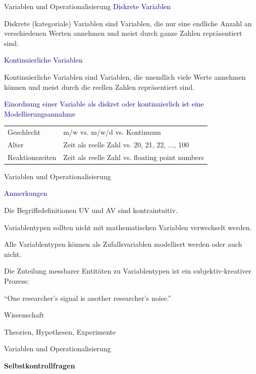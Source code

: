 \documentclass[
  8pt,
  ignorenonframetext,
]{beamer}
\begin{document}
\begin{frame}{Variablen und Operationalisierung}
\protect\hypertarget{variablen-und-operationalisierung-2}{}
\textcolor{darkblue}{Diskrete Variablen}

Diskrete (kategoriale) Variablen sind Variablen, die nur eine endliche
Anzahl an verschiedenen Werten annehmen und meist durch ganze Zahlen
repräsentiert sind. \vspace{4mm}

\textcolor{darkblue}{Kontinuierliche Variablen}

Kontinuierliche Variablen sind Variablen, die unendlich viele Werte
annehmen können und meist durch die reellen Zahlen repräsentiert sind.
\vspace{4mm}

\textcolor{darkblue}{Einordnung einer Variable als diskret oder kontinuierlich ist eine Modellierungsannahme}

\center
\begin{tabular}{ll}
Geschlecht        & m/w vs. m/w/d vs. Kontinuum                        \\
Alter             & Zeit als reelle Zahl vs. 20, 21, 22, ..., 100      \\
Reaktionszeiten   & Zeit als reelle Zahl vs. floating point numbers
\end{tabular}
\end{frame}

\begin{frame}{Variablen und Operationalisierung}
\protect\hypertarget{variablen-und-operationalisierung-3}{}

\textcolor{darkblue}{Anmerkungen}

Die Begriffsdefinitionen UV und AV sind kontraintuitiv.

Variablentypen sollten nicht mit mathematischen Variablen verwechselt
werden.

Alle Variablentypen können als Zufallsvariablen modelliert werden oder
auch nicht.

Die Zuteilung messbarer Entitäten zu Variablentypen ist ein
subjektiv-kreativer Prozess:

\center

``One researcher's signal is another researcher's noise.''
\end{frame}

\begin{frame}{}
\protect\hypertarget{section-6}{}
\vfill
{}
\Large

Wissenschaft

Theorien, Hypothesen, Experimente

Variablen und Operationalisierung

\textbf{Selbstkontrollfragen}
\end{frame}
\end{document}
